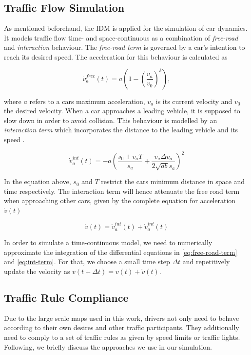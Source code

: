 \documentclass[10pt]{article}
\begin{document}
\subsection{Traffic Flow Simulation}
As mentioned beforehand, the IDM \citep{treiber2000congested} is applied for the simulation of car dynamics. It models traffic flow time- and space-continuous as a combination of \textit{free-road} and \textit{interaction} behaviour. The \textit{free-road term} is governed by a car's intention to reach its desired speed. The acceleration for this behaviour is calculated \citep{treiber2000congested} as

\begin{equation}
	\label{eq:free-road-term}
	\dot{v}_a^{free}(t) = a ( 1 - ( \frac{v_a}{v_0} )^\delta),
\end{equation}

where $a$ refers to a cars maximum acceleration, $v_a$ is its current velocity and $v_0$ the desired velocity. When a car approaches a leading vehicle, it is supposed to slow down in order to avoid collision. This behaviour is modelled by an \textit{interaction term} which incorporates the distance to the leading vehicle and its speed \citep{treiber2000congested}. 

\begin{equation}
	\label{eq:int-term}
	\dot{v}_a^{int}(t) = - a ( \frac{s_0 + v_a T}{s_a} + \frac{v_a \Delta v_a}{2 \sqrt{ab} s_a} )^2
\end{equation}

In the equation above, $s_0$ and $T$ restrict the cars minimum distance in space and time respectively. The interaction term will hence attenuate the free road term when approaching other cars, given by the complete equation for acceleration $\dot{v}(t)$

\begin{equation}
	\dot{v}(t) = \dot{v}_a^{int}(t) + \dot{v}_a^{int}(t)
\end{equation}

In order to simulate a time-continuous model, we need to numerically approximate the integration of the differential equations in \ref{eq:free-road-term} and \ref{eq:int-term}. For that, we choose a small time step $\Delta t$ and repetitively update the velocity as $v(t + \Delta t) = v(t) + \dot{v}(t)$.

\subsection{Traffic Rule Compliance}
Due to the large scale maps used in this work, drivers not only need to behave according to their own desires and other traffic participants. They additionally need to comply to a set of traffic rules as given by speed limits or traffic lights. Following, we briefly discuss the approaches we use in our simulation.
\end{document}
